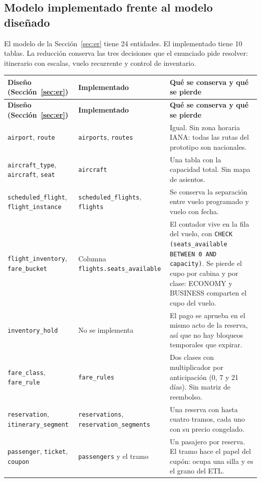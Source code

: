\subsection{Modelo implementado frente al modelo diseñado}
El modelo de la Sección~\ref{sec:er} tiene 24 entidades. El implementado tiene 10 tablas. La reducción conserva las tres decisiones que el enunciado pide resolver: itinerario con escalas, vuelo recurrente y control de inventario.

\begin{longtable}{@{}L{4.4cm} L{4.0cm} L{7.2cm}@{}}
\toprule \textbf{Diseño (Sección~\ref{sec:er})} & \textbf{Implementado} & \textbf{Qué se conserva y qué se pierde} \\ \midrule \endfirsthead
\toprule \textbf{Diseño (Sección~\ref{sec:er})} & \textbf{Implementado} & \textbf{Qué se conserva y qué se pierde} \\ \midrule \endhead
\texttt{airport}, \texttt{route} & \texttt{airports}, \texttt{routes} & Igual. Sin zona horaria IANA: todas las rutas del prototipo son nacionales. \\
\texttt{aircraft\_type}, \texttt{aircraft}, \texttt{seat} & \texttt{aircraft} & Una tabla con la capacidad total. Sin mapa de asientos. \\
\texttt{scheduled\_flight}, \texttt{flight\_instance} & \texttt{scheduled\_flights}, \texttt{flights} & Se conserva la separación entre vuelo programado y vuelo con fecha. \\
\texttt{flight\_inventory}, \texttt{fare\_bucket} & Columna \texttt{flights.seats\_available} & El contador vive en la fila del vuelo, con \texttt{CHECK (seats\_available BETWEEN 0 AND capacity)}. Se pierde el cupo por cabina y por clase: ECONOMY y BUSINESS comparten el cupo del vuelo. \\
\texttt{inventory\_hold} & No se implementa & El pago se aprueba en el mismo acto de la reserva, así que no hay bloqueos temporales que expirar. \\
\texttt{fare\_class}, \texttt{fare\_rule} & \texttt{fare\_rules} & Dos clases con multiplicador por anticipación (0, 7 y 21 días). Sin matriz de reembolso. \\
\texttt{reservation}, \texttt{itinerary\_segment} & \texttt{reservations}, \texttt{reservation\_segments} & Una reserva con hasta cuatro tramos, cada uno con su precio congelado. \\
\texttt{passenger}, \texttt{ticket}, \texttt{coupon} & \texttt{passengers} y el tramo & Un pasajero por reserva. El tramo hace el papel del cupón: ocupa una silla y es el grano del ETL. \\

\end{longtable}
